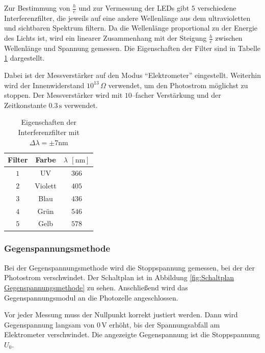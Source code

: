 \documentclass[12pt,a4paper]{scrartcl}
\numberwithin{equation}{section} %
\begin{document}
Zur Bestimmung von $\frac{h}{e}$ und zur Vermessung der LEDs gibt $5$ verschiedene Interferenzfilter, die jeweils auf eine andere Wellenlänge aus dem ultravioletten und sichtbaren Spektrum filtern. Da die Wellenlänge proportional zu der Energie des Lichts ist, wird ein linearer Zusammenhang mit der Steigung $\frac{h}{e}$ zwischen Wellenlänge und Spannung gemessen. Die Eigenschaften der Filter sind in Tabelle \ref{tab:Interferenzfilter} dargestellt.

Dabei ist der Messverstärker auf den Modus ``Elektrometer'' eingestellt. Weiterhin wird der Innenwiderstand $10^{13}\,\Omega$ verwendet, um den Photostrom möglichst zu stoppen. Der Messverstärker wird mit $10$--facher Verstärkung und der Zeitkonstante $0.3\mathrm{\,s}$  verwendet.

\begin{table}[h!]
	\centering
	\begin{tabular}{c|c|c}
		Filter & Farbe & $\lambda$ $[\mathrm{nm}]$ \\
		\hline
		$1$ & UV & $366$ \\
		$2$ & Violett & $405$ \\
		$3$ & Blau & $436$ \\
		$4$ & Grün & $546$ \\
		$5$ & Gelb & $578$ \\
	\end{tabular}
	\caption{Eigenschaften der Interferenzfilter mit $\Delta \lambda = \pm 7\mathrm{nm}$}
	\label{tab:Interferenzfilter}
\end{table}

\subsubsection{Gegenspannungsmethode}
\label{durchführung:Gegenspannung}

Bei der Gegenspannungsmethode wird die Stoppspannung gemessen, bei der der Photostrom verschwindet.  Der Schaltplan ist in Abbildung \ref{fig:Schaltplan Gegenspannungsmethode} zu sehen. Anschließend wird das Gegenspannungsmodul an die Photozelle angeschlossen.

Vor jeder Messung muss der Nullpunkt korrekt justiert werden. Dann wird Gegenspannung langsam von $0\mathrm{\,V}$ erhöht, bis der Spannungsabfall am Elektrometer verschwindet. Die angezeigte Gegenspannung ist die Stoppspannung $U_0$.
\end{document}
